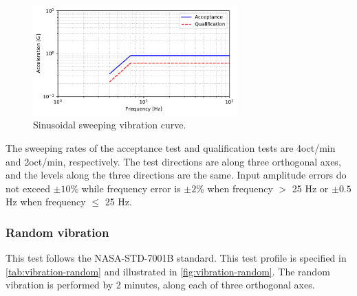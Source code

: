 \begin{figure}[!htb]
    \begin{center}
        \includegraphics[width=0.7\textwidth]{curves/sine_test.pdf}
        \caption{Sinusoidal sweeping vibration curve.}
        \label{fig:vibration-sinusoidal-curve}
    \end{center}
\end{figure}

The sweeping rates of the acceptance test and qualification tests are 4oct/min and 2oct/min, respectively. The test directions are along three orthogonal axes, and the levels along the three directions are the same. Input amplitude errors do not exceed $\pm 10$\% while frequency error is $\pm2$\% when frequency $>$ 25 Hz or $\pm0.5$ Hz when frequency $\leq$ 25 Hz.



\subsubsection{Random vibration}
 This test follows the NASA-STD-7001B standard. This test profile is specified in \autoref{tab:vibration-random} and illustrated in \autoref{fig:vibration-random}. The random vibration is performed by 2 minutes, along each of three orthogonal axes.
 

